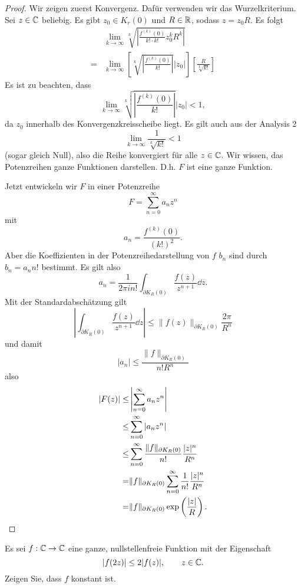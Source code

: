 \begin{proof}
	Wir zeigen zuerst Konvergenz. Dafür verwenden wir das Wurzelkriterium. Sei $z\in \mathbb{C}$ beliebig. Es gibt $z_0\in K_r(0)$ und $R\in \mathbb{R}$, sodass $z=z_0 R$. Es folgt
	\begin{align*}
		&\lim_{k \to \infty} \sqrt[k]{\left|\frac{f^{(k)}(0)}{k!\cdot k!}z_0^k R^k\right|} \\
		=&\lim_{k \to \infty} \left[\sqrt[k]{\left|\frac{f^{(k)}(0)}{k!}\right|} |z_0| \right] \left[ \frac{R}{\sqrt[k]{k!} }  \right] 
	\end{align*}
	Es ist zu beachten, dass
	\[
	\lim_{k \to \infty} \sqrt[k]{\left|\frac{f^{(k)}(0)}{k!}\right|} |z_0| < 1 
	,\]
	da $z_0$ innerhalb des Konvergenzkreisscheibe liegt. Es gilt auch aus der Analysis 2
	\[
	\lim_{k \to \infty} \frac{1}{\sqrt[k]{k!} }<1
	\]
	(sogar gleich Null), also die Reihe konvergiert für alle $z\in \mathbb{C}$. Wir wissen, das Potenzreihen ganze Funktionen darstellen. D.h. $F$ ist eine ganze Funktion.
	
	Jetzt entwickeln wir $F$ in einer Potenzreihe
	\[
	F=\sum_{n=0}^{\infty} a_n z^n
	\]
	mit
	\[
	a_n=\frac{f^{(k)}(0)}{(k!)^2}
	.\] 
	Aber die Koeffizienten in der Potenzreihedarstellung von $f$ $b_n$ sind durch $b_n = a_n n!$ bestimmt. Es gilt also
	\[
	a_n = \frac{1}{2\pi i n!}\int_{\partial K_R(0)}\frac{f(z)}{z^{n+1}}\dd{z}
	.\] 
	Mit der Standardabschätzung gilt
	\[
	\left|\int_{\partial K_R(0)} \frac{f(z)}{z^{n+1}}\dd{z}\right|\le \|f(z)\|_{\partial K_R(0)} \frac{2\pi}{R^n}
	\] 
	und damit
	\[
	|a_n|\le \frac{\|f\|_{\partial K_R(0)}}{n! R^n}
	\] 
	also
	\begin{align*}
		|F(z)|\le& \left| \sum_{n=0}^{\infty} a_n z^n \right| \\
		\le& \sum_{n=0}^{\infty} |a_n z^n|\\
		\le& \sum_{n=0}^{\infty} \frac{\|f\|_{\partial K_R(0)}}{n!} \frac{|z|^n}{R^n}\\
		=&\|f\|_{\partial K_R(0)} \sum_{n=0}^{\infty} \frac{1}{n!}\frac{|z|^n}{R^n}\\
		=&\|f\|_{\partial K_R(0)} \exp\left( \frac{|z|}{R} \right).\qedhere
	\end{align*}
\end{proof}
\begin{Problem}
	Es sei $f:\mathbb{C}\to \mathbb{C}$ eine ganze, nullstellenfreie Funktion mit der Eigenschaft
	\[
	|f(2z)|\le 2|f(z)|,\qquad z\in \mathbb{C}
	.\] 
	Zeigen Sie, dass $f$ konstant ist.
\end{Problem}
